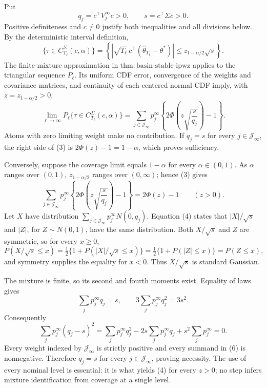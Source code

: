 Put
\[
 q_j=c^\top V_j^\infty c>0,
 \qquad s=c^\top\Sigma c>0. \tag{1}
\]
Positive definiteness and \(c\ne0\) justify both inequalities and all divisions below. By the deterministic interval definition,
\[
 \{\tau\in C_{T_\ell}^{\Sigma}(c,\alpha)\}
 =\left\{\left|\sqrt{T_\ell}\,c^\top
 (\widehat\theta_{T_\ell}-\theta^*)\right|
 \le z_{1-\alpha/2}\sqrt s\right\}. \tag{2}
\]
The finite-mixture approximation in \(\mathrm{thm:basin\text{-}stable\text{-}ipwz}\) applies to the triangular sequence \(P_\ell\). Its uniform CDF error, convergence of the weights and covariance matrices, and continuity of each centered normal CDF imply, with \(z=z_{1-\alpha/2}>0\),
\[
 \lim_{\ell\to\infty}P_\ell\{\tau\in C_{T_\ell}^{\Sigma}(c,\alpha)\}
 =\sum_{j\in\mathcal J_\infty}p_j^\infty
 \left\{2\Phi\left(z\sqrt{\frac{s}{q_j}}\right)-1\right\}. \tag{3}
\]
Atoms with zero limiting weight make no contribution. If \(q_j=s\) for every \(j\in\mathcal J_\infty\), the right side of (3) is \(2\Phi(z)-1=1-\alpha\), which proves sufficiency.

Conversely, suppose the coverage limit equals \(1-\alpha\) for every \(\alpha\in(0,1)\). As \(\alpha\) ranges over \((0,1)\), \(z_{1-\alpha/2}\) ranges over \((0,\infty)\); hence (3) gives
\[
 \sum_{j\in\mathcal J_\infty}p_j^\infty
 \left\{2\Phi\left(z\sqrt{\frac{s}{q_j}}\right)-1\right\}
 =2\Phi(z)-1
 \qquad(z>0). \tag{4}
\]
Let \(X\) have distribution \(\sum_{j\in\mathcal J_\infty}p_j^\infty N(0,q_j)\). Equation (4) states that \(|X|/\sqrt s\) and \(|Z|\), for \(Z\sim N(0,1)\), have the same distribution. Both \(X/\sqrt s\) and \(Z\) are symmetric, so for every \(x\ge0\),
\[
 P(X/\sqrt s\le x)=\tfrac12\{1+P(|X|/\sqrt s\le x)\}
 =\tfrac12\{1+P(|Z|\le x)\}=P(Z\le x),
\]
and symmetry supplies the equality for \(x<0\). Thus \(X/\sqrt s\) is standard Gaussian.

The mixture is finite, so its second and fourth moments exist. Equality of laws gives
\[
 \sum_jp_j^\infty q_j=s,
 \qquad 3\sum_jp_j^\infty q_j^2=3s^2. \tag{5}
\]
Consequently
\[
 \sum_jp_j^\infty(q_j-s)^2
 =\sum_jp_j^\infty q_j^2-2s\sum_jp_j^\infty q_j
 +s^2\sum_jp_j^\infty=0. \tag{6}
\]
Every weight indexed by \(\mathcal J_\infty\) is strictly positive and every summand in (6) is nonnegative. Therefore \(q_j=s\) for every \(j\in\mathcal J_\infty\), proving necessity. The use of every nominal level is essential: it is what yields (4) for every \(z>0\); no step infers mixture identification from coverage at a single level.